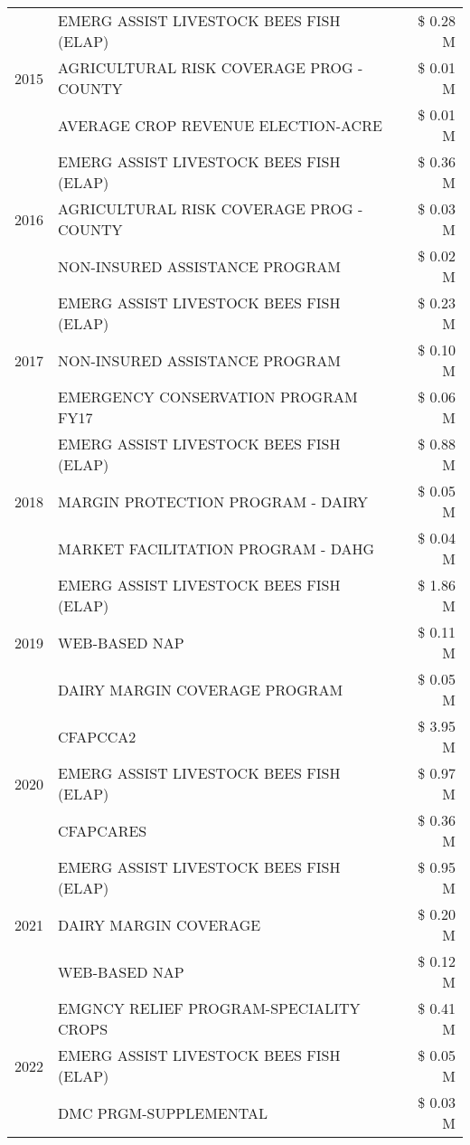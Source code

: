 \begin{tabular}{llr}
\cline{1-3}
\multirow[t]{3}{*}{2015} & EMERG ASSIST LIVESTOCK BEES FISH (ELAP) & \$ 0.28 M \\
 & AGRICULTURAL RISK COVERAGE PROG - COUNTY & \$ 0.01 M \\
 & AVERAGE CROP REVENUE ELECTION-ACRE & \$ 0.01 M \\
\cline{1-3}
\multirow[t]{3}{*}{2016} & EMERG ASSIST LIVESTOCK BEES FISH (ELAP) & \$ 0.36 M \\
 & AGRICULTURAL RISK COVERAGE PROG - COUNTY & \$ 0.03 M \\
 & NON-INSURED ASSISTANCE PROGRAM & \$ 0.02 M \\
\cline{1-3}
\multirow[t]{3}{*}{2017} & EMERG ASSIST LIVESTOCK BEES FISH (ELAP) & \$ 0.23 M \\
 & NON-INSURED ASSISTANCE PROGRAM & \$ 0.10 M \\
 & EMERGENCY CONSERVATION PROGRAM FY17 & \$ 0.06 M \\
\cline{1-3}
\multirow[t]{3}{*}{2018} & EMERG ASSIST LIVESTOCK BEES FISH (ELAP) & \$ 0.88 M \\
 & MARGIN PROTECTION PROGRAM - DAIRY & \$ 0.05 M \\
 & MARKET FACILITATION PROGRAM - DAHG & \$ 0.04 M \\
\cline{1-3}
\multirow[t]{3}{*}{2019} & EMERG ASSIST LIVESTOCK BEES FISH (ELAP) & \$ 1.86 M \\
 & WEB-BASED NAP & \$ 0.11 M \\
 & DAIRY MARGIN COVERAGE PROGRAM & \$ 0.05 M \\
\cline{1-3}
\multirow[t]{3}{*}{2020} & CFAPCCA2 & \$ 3.95 M \\
 & EMERG ASSIST LIVESTOCK BEES FISH (ELAP) & \$ 0.97 M \\
 & CFAPCARES & \$ 0.36 M \\
\cline{1-3}
\multirow[t]{3}{*}{2021} & EMERG ASSIST LIVESTOCK BEES FISH (ELAP) & \$ 0.95 M \\
 & DAIRY MARGIN COVERAGE & \$ 0.20 M \\
 & WEB-BASED NAP & \$ 0.12 M \\
\cline{1-3}
\multirow[t]{3}{*}{2022} & EMGNCY RELIEF PROGRAM-SPECIALITY CROPS & \$ 0.41 M \\
 & EMERG ASSIST LIVESTOCK BEES FISH (ELAP) & \$ 0.05 M \\
 & DMC PRGM-SUPPLEMENTAL & \$ 0.03 M \\
\cline{1-3}
\bottomrule
\end{tabular}
